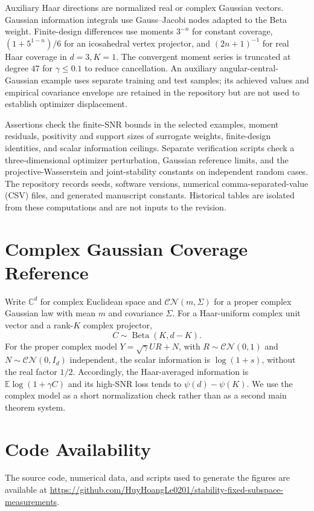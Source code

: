 \documentclass[lettersize,onecolumn]{IEEEtran}
\theoremstyle{remark}
\theoremstyle{definition}
\newcommand{\C}{\mathbb C}
\newcommand{\EE}{\mathbb E}
\begin{document}
Auxiliary Haar directions are normalized real or complex Gaussian vectors. Gaussian information integrals use Gauss--Jacobi nodes adapted to the Beta weight. Finite-design differences use moments $3^{-n}$ for constant coverage, $(1+5^{1-n})/6$ for an icosahedral vertex projector, and $(2n+1)^{-1}$ for real Haar coverage in $d=3,K=1$. The convergent moment series is truncated at degree $47$ for $\gamma\le0.1$ to reduce cancellation. An auxiliary angular-central-Gaussian example \cite{tyler1987} uses separate training and test samples; its achieved values and empirical covariance envelope are retained in the repository but are not used to establish optimizer displacement.

Assertions check the finite-SNR bounds in the selected examples, moment residuals, positivity and support sizes of surrogate weights, finite-design identities, and scalar information ceilings. Separate verification scripts check a three-dimensional optimizer perturbation, Gaussian reference limits, and the projective-Wasserstein and joint-stability constants on independent random cases. The repository records seeds, software versions, numerical comma-separated-value (CSV) files, and generated manuscript constants. Historical tables are isolated from these computations and are not inputs to the revision.

\section{Complex Gaussian Coverage Reference}\label{app:complex_check}
Write $\C^d$ for complex Euclidean space and $\mathcal{CN}(m,\Sigma)$ for a proper complex Gaussian law with mean $m$ and covariance $\Sigma$. For a Haar-uniform complex unit vector and a rank-$K$ complex projector,
\begin{equation}
C\sim\operatorname{Beta}(K,d-K).
\label{eq:beta_complex}
\end{equation}
For the proper complex model $Y=\sqrt\gamma UR+N$, with $R\sim\mathcal{CN}(0,1)$ and $N\sim\mathcal{CN}(0,I_d)$ independent, the scalar information is $\log(1+s)$, without the real factor $1/2$. Accordingly, the Haar-averaged information is $\EE\log(1+\gamma C)$ and its high-SNR loss tends to $\psi(d)-\psi(K)$. We use the complex model as a short normalization check rather than as a second main theorem system.

\section*{Code Availability}
The source code, numerical data, and scripts used to generate the figures are available at
\url{https://github.com/HuyHoangLe0201/stability-fixed-subspace-measurements}.
\end{document}
